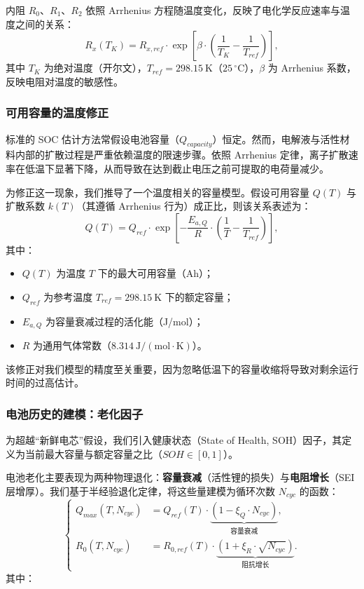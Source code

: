 \documentclass[11pt,a4paper]{ctexart}
\begin{document}
内阻 $R_0$、$R_1$、$R_2$ 依照 Arrhenius 方程随温度变化，反映了电化学反应速率与温度之间的关系：
\begin{equation}
R_x(T_K) = R_{x,ref}\cdot\exp\left[\beta\cdot\left(\frac{1}{T_K}-\frac{1}{T_{ref}}\right)\right],
\end{equation}
其中 $T_K$ 为绝对温度（开尔文），$T_{ref} = 298.15\ \mathrm{K}$（$25\,^{\circ}\mathrm{C}$），$\beta$ 为 Arrhenius 系数，反映电阻对温度的敏感性。

\subsubsection{可用容量的温度修正}

标准的 SOC 估计方法常假设电池容量（$Q_{capacity}$）恒定。然而，电解液与活性材料内部的扩散过程是严重依赖温度的限速步骤。依照 Arrhenius 定律，离子扩散速率在低温下显著下降，从而导致在达到截止电压之前可提取的电荷量减少。

为修正这一现象，我们推导了一个温度相关的容量模型。假设可用容量 $Q(T)$ 与扩散系数 $k(T)$（其遵循 Arrhenius 行为）成正比，则该关系表述为：
\begin{equation}
Q(T) = Q_{ref}\cdot\exp\left[-\frac{E_{a,Q}}{R}\cdot\left(\frac{1}{T}-\frac{1}{T_{ref}}\right)\right],
\end{equation}
其中：

\begin{itemize}[leftmargin=1.6em,itemsep=0.2em]
\item $Q(T)$ 为温度 $T$ 下的最大可用容量（Ah）；
\item $Q_{ref}$ 为参考温度 $T_{ref} = 298.15\ \mathrm{K}$ 下的额定容量；
\item $E_{a,Q}$ 为容量衰减过程的活化能（J/mol）；
\item $R$ 为通用气体常数（$8.314\ \mathrm{J/(mol\cdot K)}$）。
\end{itemize}

该修正对我们模型的精度至关重要，因为忽略低温下的容量收缩将导致对剩余运行时间的过高估计。

\subsubsection{电池历史的建模：老化因子}

为超越“新鲜电芯”假设，我们引入健康状态（State of Health, SOH）因子，其定义为当前最大容量与额定容量之比（$SOH\in[0,1]$）。

电池老化主要表现为两种物理退化：\textbf{容量衰减}（活性锂的损失）与\textbf{电阻增长}（SEI 层增厚）。我们基于半经验退化定律，将这些量建模为循环次数 $N_{cyc}$ 的函数：
\begin{equation}
\left\{
\begin{aligned}
Q_{max}(T,N_{cyc}) &= Q_{ref}(T)\cdot\underbrace{\left(1-\xi_Q\cdot N_{cyc}\right)}_{\text{容量衰减}},\\[6pt]
R_0(T,N_{cyc}) &= R_{0,ref}(T)\cdot\underbrace{\left(1+\xi_R\cdot\sqrt{N_{cyc}}\right)}_{\text{阻抗增长}}.
\end{aligned}
\right.
\end{equation}
其中：
\end{document}

